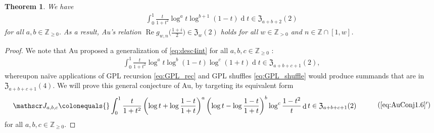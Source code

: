 \documentclass[final,notitlepage,12pt,reqno]{amsart}
\DeclareMathOperator{\D}{d}
\DeclareMathOperator{\R}{Re}
\theoremstyle{plain}
\newtheorem{theorem}{Theorem}[section]
\theoremstyle{definition}
\numberwithin{equation}{section}
\begin{document}
\begin{theorem}We have \begin{align}
\int_0^1\frac{t}{1+t^{2}}\log^a t \log^{b+1}(1-t)\D t\in\mathfrak Z_{a+b+2}(2)\label{eq:desc4int}
\end{align}for all $a,b\in\mathbb Z_{\geq0}$.  As a result, Au's relation $\R g_{w,n}\big(\frac{1+i}2\big)\in\mathfrak Z_w(2)$ holds for all $ w\in\mathbb Z_{>0}$ and $ n\in\mathbb Z\cap[1,w]$.
\end{theorem}\begin{proof}We note that Au proposed a generalization of  \eqref{eq:desc4int}  for all $ a,b,c\in\mathbb Z_{\geq0}$ \cite[Conjecture 1.6]{Au2022a}:\begin{align}
 \int_0^1\frac{t}{1+t^{2}}\log^a t \log^{b}(1-t)\log^{c}(1+t)\D t\in\mathfrak Z_{a+b+c+1}(2),\label{eq:AuConj1.6}
\end{align}whereupon na\"ive applications of  GPL recursion \eqref{eq:GPL_rec}  and GPL shuffles \eqref{eq:GPL_shuffle} would produce summands that are in $\mathfrak Z_{a+b+c+1}(4)$. We will  prove this general conjecture of Au, by targeting its equivalent form \begin{align}\begin{split}\mathscr J_{a,b,c}\colonequals{}&\int_{0}^{1}\frac{t}{1+t^{2}}\left(\log t+\log\frac{1-t}{1+t}\right)^{a}\left(\log t-\log\frac{1-t}{1+t}\right)^{b}\log^{c}\frac{1-t^2}{t}\D t\in\mathfrak Z_{a+b+c+1}(2)
\end{split}\tag{\ref{eq:AuConj1.6}$'$}\label{eq:AuConj1.6'}
\end{align} for all $ a,b,c\in\mathbb Z_{\geq0}$.  


\end{proof}
\end{document}
